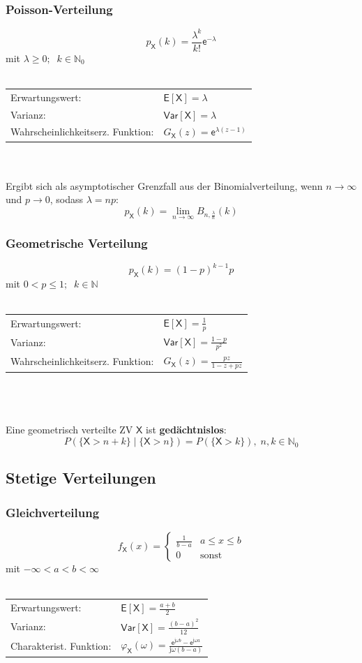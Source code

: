\documentclass[a4paper,twocolumn,10pt]{article}
\newcommand{\varX}{\mathsf{Var[X]}}
\newcommand{\erwX}{\mathsf{E[X]}}
\newcommand{\e}{\mathsf{e}}
\newcommand{\X}{\mathsf{X}}
\newcommand{\im}{\mathrm{j}}
\begin{document}
\subsubsection{Poisson-Verteilung}
\[p_\mathsf X(k) = \frac{\lambda^k}{k!}\e^{-\lambda}\]
mit $\lambda \geq 0;\;\;k \in \mathbb N_0$\\\\
\begin{tabular}{ll}
Erwartungswert: &$\erwX=\lambda$\\
Varianz: &$\varX=\lambda$\\
Wahrscheinlichkeitserz. Funktion: &$G_\X(z)=\e^{\lambda(z-1)}$
\end{tabular}\\\\
Ergibt sich als asymptotischer Grenzfall aus der Binomialverteilung, wenn $n \rightarrow \infty$ und $p \rightarrow 0$, sodass $\lambda=np$:
\[p_\mathsf X(k) = \lim_{n \to \infty}B_{n,\frac{\lambda}{n}}(k)\]

\subsubsection{Geometrische Verteilung}
\[p_\mathsf X(k) = (1 - p)^{k-1}p\]
mit $0<p\leq 1;\;\;k \in \mathbb N$\\\\
\begin{tabular}{ll}
Erwartungswert: &$\erwX=\frac{1}{p}$\\
Varianz: &$\varX=\frac{1-p}{p^2}$\\
Wahrscheinlichkeitserz. Funktion: &$G_\X(z)=\frac{pz}{1-z+pz}$
\end{tabular}\\\\\\
Eine geometrisch verteilte ZV $\X$ ist \textbf{gedächtnislos}:
\[P(\{\mathsf X > n + k\} \mid \{\mathsf X > n\}) = P(\{\mathsf X > k\}),\; n,k \in \mathbb N_0\]

\subsection{Stetige Verteilungen}

\subsubsection{Gleichverteilung}
\[f_\X(x) =
\begin{cases}
  \frac{1}{b-a}  & a\leq x\leq b\\
  0 & \text{sonst}
\end{cases}\]
mit $ - \infty < a < b <\infty $\\\\
\begin{tabular}{ll}
Erwartungswert: &$\erwX=\frac{a+b}{2}$\\
Varianz: &$\varX=\frac{(b-a)^2}{12}$\\
Charakterist. Funktion: &$\varphi_\X(\omega)=\frac{\e^{\im\omega b} -\e^{\im\omega a}}{\im\omega(b-a)}$
\end{tabular}
\end{document}

